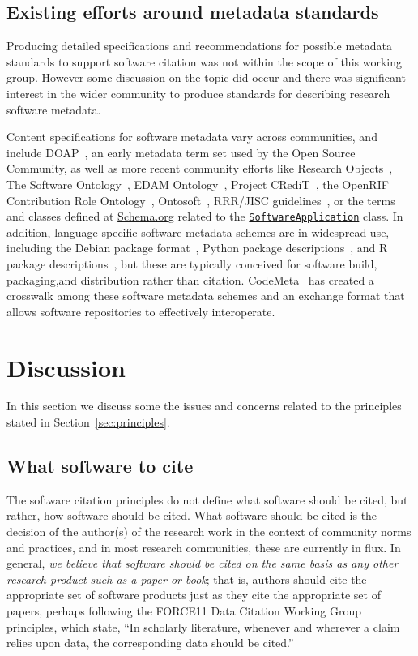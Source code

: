 \documentclass[12pt, oneside]{amsart}
\begin{document}
\subsection{Existing efforts around metadata standards}

Producing detailed specifications and recommendations for possible metadata
standards to support software citation was not within the scope of this working
group. However some discussion on the topic did occur and there was significant
interest in the wider community to produce standards for describing research
software metadata.

Content specifications for software metadata vary across communities, and
include DOAP~\cite{DOAP}, an early metadata
term set used by the Open Source Community, as well as more recent community
efforts like Research Objects~\cite{Bechhofer2013599}, The Software Ontology~\cite{Malone2014}, EDAM Ontology~\cite{Ison15052013}, Project
CRediT~\cite{casrai-credit}, the OpenRIF Contribution Role Ontology~\cite{Gutzman2016}, Ontosoft~\cite{ontosoft}, RRR\slash JISC guidelines~\cite{JISC2015},
or the terms and classes defined at \href{https://schema.org}{Schema.org} related to the
\href{https://schema.org/SoftwareApplication}{\texttt{SoftwareApplication}} class.   In addition,
language-specific software metadata schemes are in widespread use, including the Debian
package format~\cite{Debian_policy}, Python package descriptions~\cite{pypi}, and R package descriptions~\cite{wickham_r_2015}, but these are typically
conceived for software build, packaging,and distribution rather than citation.  CodeMeta~\cite{codemeta}
has created a crosswalk among these software metadata schemes and an exchange format that
allows software repositories to effectively interoperate.


\section{Discussion}
\label{sec:discussion}

In this section we discuss some the issues and concerns related to the principles stated in Section~\ref{sec:principles}.

\subsection{What software to cite}

The software citation principles do not define what software should be cited, but rather, how software should be cited.
What software should be cited is the decision of the author(s) of the research work in the context of community norms and practices, and in most research communities, these are currently in flux.
In general, \textit{we believe that software should be cited on the same basis as any other research product such as a paper or book}; that is, authors should cite the appropriate set of software products just as they cite the appropriate set of papers, perhaps following the
FORCE11 Data Citation Working Group principles, which state, ``In scholarly literature, whenever and wherever a claim relies upon data, the corresponding data should be cited.''~\cite{data-citation-principles}
\end{document}
